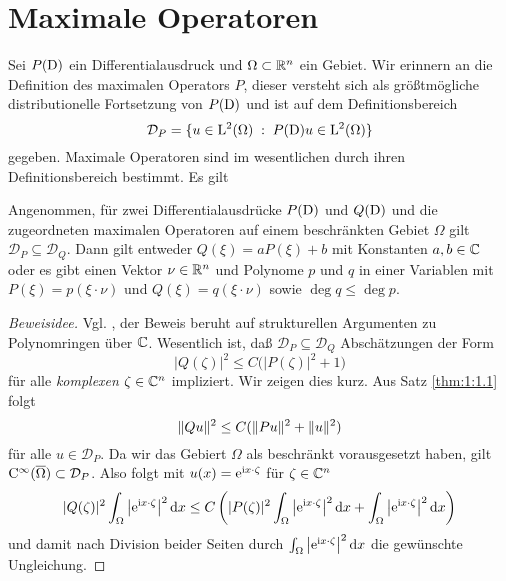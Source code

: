 \chapter{Maximale Operatoren}


Sei $P(\mathrm D)$ ein Differentialausdruck und $\Omega\subset\mathbb R^n$ ein Gebiet. Wir erinnern an die Definition des maximalen Operators $P$, dieser versteht sich als größtmögliche distributionelle Fortsetzung von $P(\mathrm D)$ und ist auf dem Definitionsbereich
\begin{equation}
   \mathcal D_P = \{ u\in\mathrm L^2(\Omega)\;:\; P(\mathrm D)u\in\mathrm L^2(\Omega) \}
\end{equation}
gegeben. Maximale Operatoren sind im wesentlichen durch ihren Definitionsbereich bestimmt. Es gilt
\begin{thm}
Angenommen, für zwei Differentialausdrücke $P(\mathrm D)$ und $Q(\mathrm D)$ und die zugeordneten maximalen Operatoren auf einem beschränkten Gebiet $\Omega$ gilt $\mathcal D_P\subseteq\mathcal D_Q$. Dann gilt
entweder $Q(\xi)=a P(\xi) + b$ mit Konstanten $a,b\in\mathbb C$ oder es gibt einen Vektor $\nu\in\mathbb R^n$ und Polynome $p$ und $q$ in einer Variablen mit
$P(\xi)=p(\xi\cdot\nu)$ und $Q(\xi)=q(\xi\cdot\nu)$ sowie $\deg q\le\deg p$.
\end{thm}
\begin{proof}[Beweisidee] Vgl. \cite{Hormander:1955}, der Beweis beruht auf strukturellen Argumenten zu Polynomringen über $\mathbb C$. Wesentlich ist, daß $\mathcal D_P\subseteq \mathcal D_Q$ Abschätzungen der Form
\begin{equation}
   |Q(\zeta)|^2 \le C \big( |P(\zeta)|^2 + 1\big)
\end{equation}
für alle {\em komplexen} $\zeta\in\mathbb C^n$ impliziert. Wir zeigen dies kurz. Aus Satz \ref{thm:1:1.1} folgt
\begin{equation}
\lVert Qu\rVert^2\leq C(\lVert Pu\rVert^2+\lVert u\rVert^2)
\end{equation}
für alle $u\in\mathcal{D}_P$. Da wir das Gebiert $\Omega$ als beschränkt vorausgesetzt haben, gilt $\mathrm C^\infty(\overline{\Omega})\subset\mathcal{D}_P$. Also folgt mit $u(x)=\mathrm e^{\mathrm i x\cdot \zeta}$ für $\zeta\in\mathbb C^n$
\begin{equation}
\lvert Q(\zeta)\rvert^2\int_\Omega \big|\mathrm e^{\mathrm i x\cdot \zeta}\big|^2\,\mathrm d x \leq C \left( \lvert P(\zeta)\rvert^2\int_\Omega \big|\mathrm e^{\mathrm i x\cdot \zeta}\big|^2\,\mathrm d x+\int_\Omega \big|\mathrm e^{\mathrm i x\cdot \zeta}\big|^2\,\mathrm d x  \right)
\end{equation}
und damit nach Division beider Seiten durch $ \int_\Omega \big|\mathrm e^{\mathrm i x\cdot \zeta}\big|^2\,\mathrm d x$ die gewünschte Ungleichung.
\end{proof}

